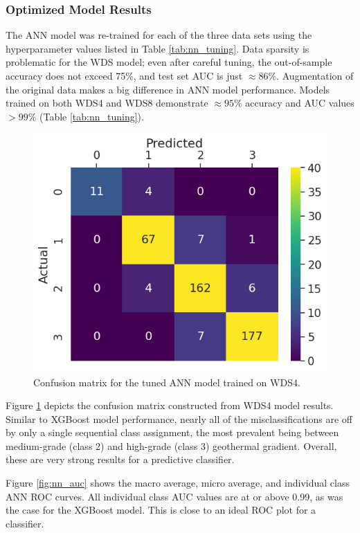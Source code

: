 \subsubsection{Optimized Model Results}\label{ch5:nn_final_results}
The ANN model was re-trained for each of the three data sets using the hyperparameter values listed in Table \ref{tab:nn_tuning}. Data sparsity is problematic for the WDS model; even after careful tuning, the out-of-sample accuracy does not exceed 75\%, and test set AUC is just $\approx86\%$. Augmentation of the original data makes a big difference in ANN model performance. Models trained on both WDS4 and WDS8 demonstrate $\approx95\%$ accuracy and AUC values $>99\%$ (Table \ref{tab:nn_tuning}).
 
\begin{figure}[htp]
\centering
\includegraphics[width=.5\textwidth]{templates/images/Figure-NN-ConfusionMatrix_WDS4.png}
\singlespacing
\caption[Neural network confusion matrix]{Confusion matrix for the tuned ANN model trained on WDS4.}
\label{fig:nn_confusion_matrix}
\end{figure}

Figure \ref{fig:nn_confusion_matrix} depicts the confusion matrix constructed from WDS4 model results. Similar to XGBoost model performance, nearly all of the misclassifications are off by only a single sequential class assignment, the most prevalent being between medium-grade (class 2) and high-grade (class 3) geothermal gradient. Overall, these are very strong results for a predictive classifier.

Figure \ref{fig:nn_auc} shows the macro average, micro average, and individual class ANN ROC curves. All individual class AUC values are at or above 0.99, as was the case for the XGBoost model. This is close to an ideal ROC plot for a classifier.


